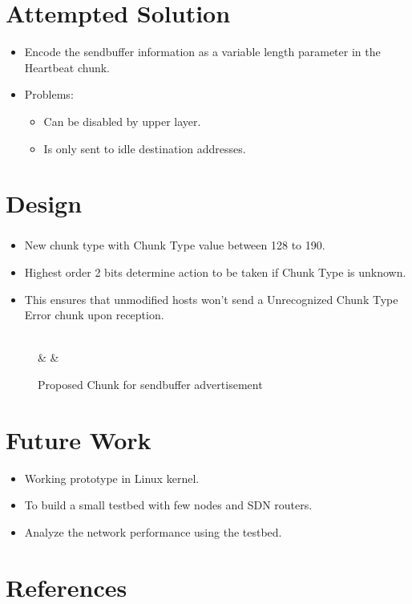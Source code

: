 \documentclass{beamer}
\begin{document}
\section{Attempted Solution}
\begin{frame}{\insertsection}
\begin{itemize}
\item Encode the sendbuffer information as a variable length
	parameter in the Heartbeat chunk.
\item Problems:
	\begin{itemize}
		\item Can be disabled by upper layer.
		\item Is only sent to idle destination addresses.
	\end{itemize}
\end{itemize}
\end{frame}


\section{Design}
\begin{frame}[fragile]
\frametitle{\insertsection}
\begin{itemize}
\item New chunk type with Chunk Type value between 128 to 190.
\item Highest order 2 bits determine action to be taken if Chunk Type is
	unknown.
\item This ensures that unmodified hosts won't send a
	Unrecognized Chunk Type Error chunk upon reception.
\end{itemize}

\begin{figure}[h]
	\centering
	\begin{bytefield}{32}
	\\
	 &  & \\
	\end{bytefield}
	\caption{Proposed Chunk for sendbuffer advertisement}
\end{figure}
\end{frame}

\section{Future Work}
\begin{frame}{\insertsection}
\begin{itemize}
\item Working prototype in Linux kernel.
\item To build a small testbed with few nodes and SDN routers.
\item Analyze the network performance using the testbed.
\end{itemize}
\end{frame}

\section{References}
\begin{frame}[allowframebreaks]
\frametitle<presentation>{\insertsection}
\nocite{*}
\printbibliography
\end{frame}
\end{document}
